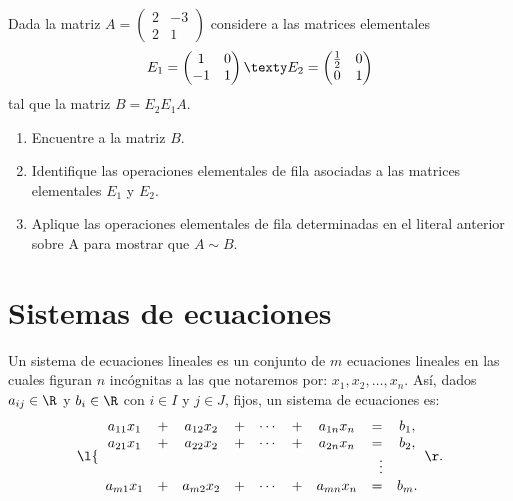 \documentclass[compacto,10pt]{pubciencias-notas}
\begin{document}
\begin{ejer}\hspace{0pt} Dada la matriz $A = \begin{pmatrix}2&-3\\2&1\end{pmatrix}$ considere a las matrices elementales
\[
    E_{1} = \begin{pmatrix}1&0\\-1&1\end{pmatrix}
    \texty
    E_{2} = \begin{pmatrix}\frac{1}{2}&0\\0&1\end{pmatrix}
\]
tal que la matriz $B = E_{2}E_{1}A$.
\begin{enumerate}
\item[$a)$] Encuentre a la matriz $B$.
\item[$b)$] Identifique las operaciones elementales de fila asociadas a las matrices elementales $E_{1}$ y $E_{2}$.
\item[$c)$] Aplique las operaciones elementales de fila determinadas en el literal anterior sobre A para mostrar que $A\sim B$.
\end{enumerate}
\end{ejer}

\setcounter{section}{1}
\section{Sistemas de ecuaciones}

\begin{defi}
    Un sistema de ecuaciones lineales es un conjunto de $m$ ecuaciones lineales en las cuales figuran $n$ incógnitas a las que notaremos por: $x_1, x_2, \ldots, x_n$. Así, dados $a_{ij}\in\R$ y $b_i\in \R$ con $i\in I$ y $j\in J$, fijos, un sistema de ecuaciones es:
    \[
    \l\{
    \begin{array}{cccccccccc}
        a_{11}x_1& + &a_{12}x_2& + &\cdots &+& a_{1n}x_n &= &b_1,\\
        a_{21}x_1& + &a_{22}x_2& + &\cdots &+& a_{2n}x_n &= &b_2,\\
                &&&    &            &        & &\hspace{2mm} \vdots&\\
        a_{m1}x_1& + &a_{m2}x_2& + &\cdots &+& a_{mn}x_n &= &b_m.
    \end{array}
    \r.
    \]
\end{defi}
\end{document}
